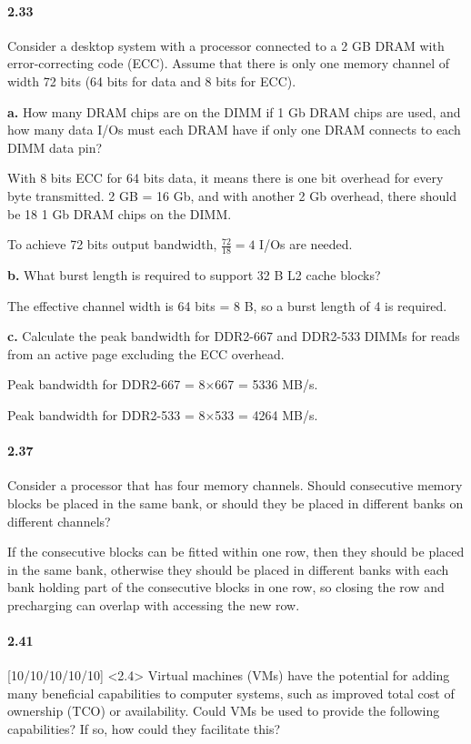 \documentclass{article}
\begin{document}
\paragraph{2.33} Consider a desktop system with a processor connected to a 2 GB DRAM with error-correcting code (ECC). Assume that there is only one memory channel of width 72 bits (64 bits for data and 8 bits for ECC).

\textbf{a.} How many DRAM chips are on the DIMM if 1 Gb DRAM chips are used, and how many data I/Os must each DRAM have if only one DRAM connects to each DIMM data pin?

With 8 bits ECC for 64 bits data, it means there is one bit overhead for every byte transmitted. 2 GB = 16 Gb, and with another 2 Gb overhead, there should be 18 1 Gb DRAM chips on the DIMM.

To achieve 72 bits output bandwidth, $\frac{72}{18}=4$ I/Os are needed.

\textbf{b.} What burst length is required to support 32 B L2 cache blocks?

The effective channel width is 64 bits = 8 B, so a burst length of 4 is required.

\textbf{c.} Calculate the peak bandwidth for DDR2-667 and DDR2-533 DIMMs for reads from an active page excluding the ECC overhead.

Peak bandwidth for DDR2-667 = 8$\times$667 = 5336 MB/s.

Peak bandwidth for DDR2-533 = 8$\times$533 = 4264 MB/s.

\paragraph{2.37} Consider a processor that has four memory channels. Should consecutive memory blocks be placed in the same bank, or should they be placed in different banks on different channels?

If the consecutive blocks can be fitted within one row, then they should be placed in the same bank, otherwise they should be placed in different banks with each bank holding part of the consecutive blocks in one row, so closing the row and precharging can overlap with accessing the new row.

\paragraph{2.41} [10/10/10/10/10] <2.4> Virtual machines (VMs) have the potential for adding many beneficial capabilities to computer systems, such as improved total cost of ownership (TCO) or availability. Could VMs be used to provide the following capabilities? If so, how could they facilitate this?
\end{document}
